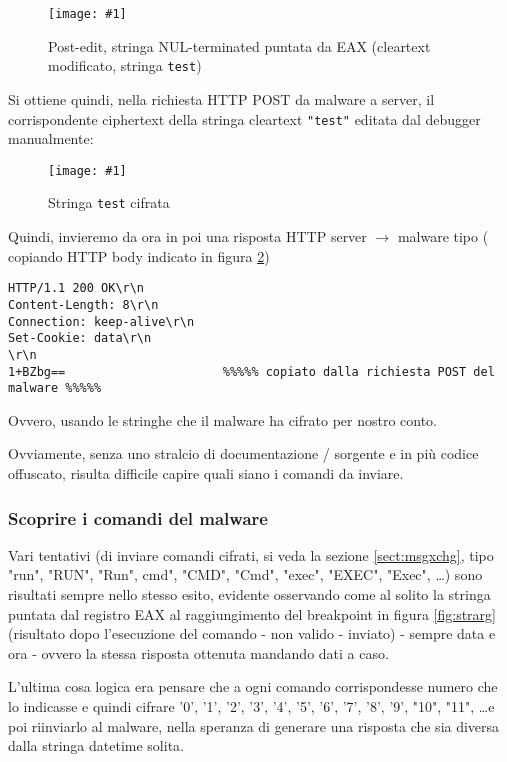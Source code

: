 \documentclass[
    a4paper, %
    11pt %
]{article}
\newcommand{\pic}[4]{\begin{figure}[H]
            \centering
            \texttt{[image: \#1]}
            \caption{#2}
            \label{fig:#1}
            \end{figure}}
\begin{document}
            \pic{edit_after}{Post-edit, stringa NUL-terminated puntata da EAX (cleartext modificato, 
            stringa \texttt{test})}{12cm}{3cm}

            \pagebreak

            Si ottiene quindi, nella richiesta HTTP POST da malware a server, il corrispondente ciphertext della stringa cleartext \texttt{"test"} editata dal debugger manualmente:
            
            \pic{enc_after_edit}{Stringa \texttt{test} cifrata}{19cm}{5.5cm}

            Quindi, invieremo da ora in poi una risposta HTTP server $\rightarrow$ malware tipo (
            copiando HTTP body indicato in figura \ref{fig:enc_after_edit})

            \begin{lstlisting}
HTTP/1.1 200 OK\r\n
Content-Length: 8\r\n
Connection: keep-alive\r\n
Set-Cookie: data\r\n
\r\n
1+BZbg==                      %%%%% copiato dalla richiesta POST del malware %%%%%
            \end{lstlisting}

            Ovvero, usando le stringhe che il malware ha cifrato per nostro conto.
            
            Ovviamente, senza uno stralcio di documentazione / sorgente e in più codice offuscato, risulta
            difficile capire quali siano i comandi da inviare.

            \subsubsection{Scoprire i comandi del malware}
            
            Vari tentativi (di inviare comandi cifrati,
            si veda la sezione \ref{sect:msgxchg}, tipo "run", "RUN", "Run", cmd", "CMD", "Cmd", "exec", "EXEC", 
            "Exec", \dots) sono risultati sempre
            nello stesso esito, evidente osservando come al solito la stringa puntata dal registro EAX al 
            raggiungimento del breakpoint in figura \ref{fig:strarg} (risultato dopo l'esecuzione del comando - non valido - inviato) - sempre data e ora - ovvero la stessa
            risposta ottenuta mandando dati a caso.

            L'ultima cosa logica era pensare che a ogni comando corrispondesse numero che lo indicasse e quindi cifrare
            '0', '1', '2', '3', '4', '5', '6', '7', '8', '9', "10", "11", \dots e poi riinviarlo al malware,
            nella speranza di generare una risposta che sia diversa dalla stringa datetime solita.
            
\end{document}
